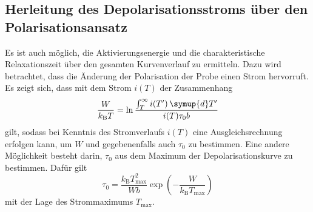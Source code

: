 \subsection{Herleitung des Depolarisationsstroms über den Polarisationsansatz}

Es ist auch möglich, die Aktivierungsenergie und die charakteristische Relaxationszeit über den gesamten Kurvenverlauf zu ermitteln. Dazu wird betrachtet, dass die Änderung der Polarisation der Probe einen Strom hervorruft.
Es zeigt sich, dass mit dem Strom $i(T)$ der Zusammenhang
\begin{equation}
  \frac{W}{k_\text{B}T} = \ln \frac{\int_T^\infty i(T')\,\symup{d}T'}{i(T) \tau_0 b}
\end{equation}
gilt, sodass bei Kenntnis des Stromverlaufs $i(T)$ eine Ausgleichsrechnung erfolgen kann, um $W$ und gegebenenfalls auch $\tau_0$ zu bestimmen.
Eine andere Möglichkeit besteht darin, $\tau_0$ aus dem Maximum der Depolarisationskurve zu bestimmen. Dafür gilt
\begin{equation}
  \tau_0 = \frac{k_\text{B}T_{\text{max}}^2}{Wb}\exp\left(-\frac{W}{k_\text{B}T_\text{max}}\right)
\end{equation}
mit der Lage des Strommaximums $T_\text{max}$.
